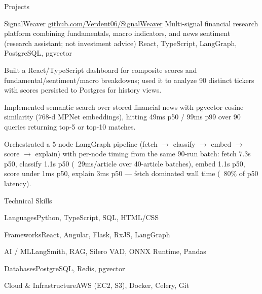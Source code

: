 \documentclass[
	11pt
]{../../../template}
\begin{document}
	\begin{rSection}{P}{rojects}
		\begin{rSectionEntry}
			{SignalWeaver}
			{\href{https://github.com/Verdent06/SignalWeaver}{github.com/Verdent06/SignalWeaver}}
			{Multi-signal financial research platform combining fundamentals, macro indicators, and news sentiment (research assistant; not investment advice)}
			{React, TypeScript, LangGraph, PostgreSQL, pgvector}
			{}

			\item Built a React/TypeScript dashboard for composite scores and fundamental/sentiment/macro breakdowns; used it to analyze 90 distinct tickers with scores persisted to Postgres for history views.
			\item Implemented semantic search over stored financial news with pgvector cosine similarity (768-d MPNet embeddings), hitting 49ms p50 / 99ms p99 over 90 queries returning top-5 or top-10 matches.
			\item Orchestrated a 5-node LangGraph pipeline (fetch $\rightarrow$ classify $\rightarrow$ embed $\rightarrow$ score $\rightarrow$ explain) with per-node timing from the same 90-run batch: fetch 7.3s p50, classify 1.1s p50 (~29ms/article over 40-article batches), embed 1.1s p50, score under 1ms p50, explain 3ms p50 --- fetch dominated wall time (~80\% of p50 latency).
		\end{rSectionEntry}
	\end{rSection}

	\begin{rSection}{T}{echnical Skills}
		\begin{rSet}{Languages}{Python, TypeScript, SQL, HTML/CSS}
		\end{rSet}
		\begin{rSet}{Frameworks}{React, Angular, Flask, RxJS, LangGraph}
		\end{rSet}
		\begin{rSet}{AI / ML}{LangSmith, RAG, Silero VAD, ONNX Runtime, Pandas}
		\end{rSet}
		\begin{rSet}{Databases}{PostgreSQL, Redis, pgvector}
		\end{rSet}
		\begin{rSet}{Cloud \& Infrastructure}{AWS (EC2, S3), Docker, Celery, Git}
		\end{rSet}
	\end{rSection}
\end{document}
